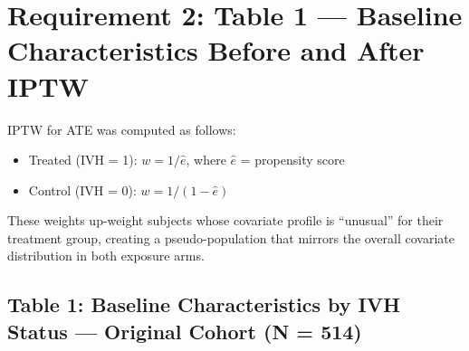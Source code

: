 \documentclass[
]{article}
\providecommand{\tightlist}{%
  \setlength{\itemsep}{0pt}\setlength{\parskip}{0pt}}
\begin{document}
\hypertarget{requirement-2-table-1-baseline-characteristics-before-and-after-iptw}{%
\section{Requirement 2: Table 1 --- Baseline Characteristics Before and
After
IPTW}\label{requirement-2-table-1-baseline-characteristics-before-and-after-iptw}}

IPTW for ATE was computed as follows:

\begin{itemize}
\tightlist
\item
  Treated (IVH = 1): \(w = 1 / \hat{e}\), where \(\hat{e}\) = propensity
  score
\item
  Control (IVH = 0): \(w = 1 / (1 - \hat{e})\)
\end{itemize}

These weights up-weight subjects whose covariate profile is ``unusual''
for their treatment group, creating a pseudo-population that mirrors the
overall covariate distribution in both exposure arms.

\hypertarget{table-1-baseline-characteristics-by-ivh-status-original-cohort-n-514}{%
\subsection{Table 1: Baseline Characteristics by IVH Status --- Original
Cohort (N =
514)}\label{table-1-baseline-characteristics-by-ivh-status-original-cohort-n-514}}
\end{document}

